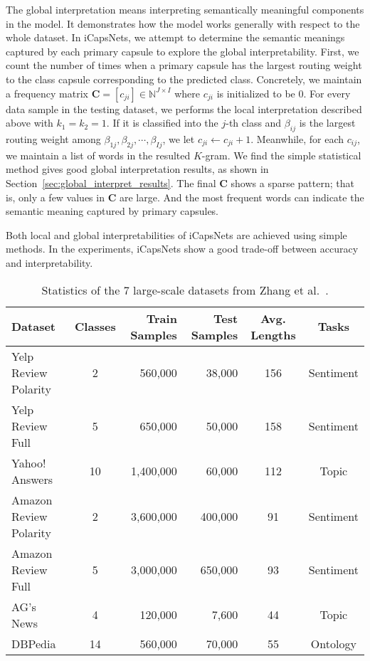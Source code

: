 \documentclass[10pt,journal,compsoc]{IEEEtran}
\begin{document}
The global interpretation means interpreting semantically meaningful components in the model. It demonstrates how the model works generally with respect to the whole dataset. In iCapsNets, we attempt to determine the semantic meanings captured by each primary capsule to explore the global interpretability. First, we count the number of times when a primary capsule has the largest routing weight to the class capsule corresponding to the predicted class. Concretely, we maintain a frequency matrix $\mathbf{C}=[c_{ji}] \in \mathbb{N}^{J \times I}$ where $c_{ji}$ is initialized to be 0. For every data sample in the testing dataset, we performs the local interpretation described above with $k_1=k_2=1$. If it is classified into the $j$-th class and $\beta_{ij}$ is the largest routing weight among $\beta_{1j}, \beta_{2j}, \cdots, \beta_{Ij}$, we let $c_{ji} \leftarrow c_{ji} + 1$. Meanwhile, for each $c_{ij}$, we maintain a list of words in the resulted $K$-gram. We find the simple statistical method gives good global interpretation results, as shown in Section~\ref{sec:global_interpret_results}. The final $\mathbf{C}$ shows a sparse pattern; that is, only a few values in $\mathbf{C}$ are large. And the most frequent words can indicate the semantic meaning captured by primary capsules.

Both local and global interpretabilities of iCapsNets are achieved using simple methods. In the experiments, iCapsNets show a good trade-off between accuracy and interpretability.

\begin{table*}[t]
	\caption{Statistics of the 7 large-scale datasets from Zhang et al.~\cite{zhang2015character}.}
	\begin{center}
		\begin{tabular}{l|crrcc}
			Dataset & Classes & Train Samples & Test Samples & Avg. Lengths & Tasks \\
			\hline
			Yelp Review Polarity & 2 & 560,000 & 38,000 & 156 & Sentiment \\
			Yelp Review Full & 5 & 650,000 & 50,000 & 158 & Sentiment \\
			Yahoo! Answers & 10 & 1,400,000 & 60,000 & 112 & Topic \\
			Amazon Review Polarity & 2 & 3,600,000 & 400,000 & 91 & Sentiment \\
			Amazon Review Full & 5 & 3,000,000 & 650,000 & 93 & Sentiment \\
			AG's News & 4 & 120,000 & 7,600 & 44 & Topic \\
			DBPedia & 14 & 560,000 & 70,000 & 55 & Ontology \\
		\end{tabular}
		\label{table:dataset}
	\end{center}
\end{table*}
\end{document}
